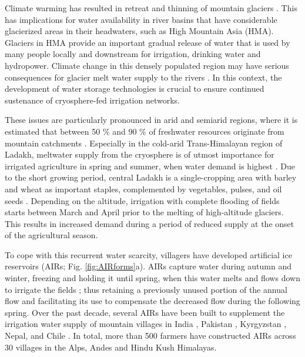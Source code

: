 \documentclass[tc, manuscript]{copernicus}
\begin{document}

\introduction

Climate warming has resulted in retreat and thinning of mountain glaciers
\citep{ipccCrossChapterPaperMountains2022}. This has implications for water availability in river basins that
have considerable glacierized areas in their headwaters, such as High Mountain Asia (HMA). Glaciers in HMA
provide an important gradual release of water that is used by many people locally and downstream for irrigation,
drinking water and hydropower. Climate change in this densely populated region may have serious consequences for
glacier melt water supply to the rivers \citep{immerzeelImportanceVulnerabilityWorld2020}. In this context, the
development of water storage technologies is crucial to ensure continued sustenance of cryosphere-fed irrigation
networks.

These issues are particularly pronounced in arid and semiarid regions, where it is estimated that between 50 \%
and 90 \% of freshwater resources originate from mountain catchments
\citep{mukhopadhyayReevaluationSnowmeltGlacial2015}. Especially in the cold-arid Trans-Himalayan region of
Ladakh, meltwater supply from the cryosphere is of utmost importance for irrigated agriculture in spring and
summer, when water demand is highest \citep{nusserCryosphereFedIrrigationNetworks2019}. Due to the short growing
period, central Ladakh is a single-cropping area with barley and wheat as important staples, complemented by
vegetables, pulses, and oil seeds \citep{nusserSociohydrologyArtificialGlaciers2019}. Depending on the altitude,
irrigation with complete flooding of fields starts between March and April prior to the melting of high-altitude
glaciers. This results in increased demand during a period of reduced supply at the onset of the agricultural
season.

To cope with this recurrent water scarcity, villagers have developed artificial ice reservoirs (AIRs; Fig.
\ref{fig:AIRforms}a). AIRs capture water during autumn and winter, freezing and holding it until spring, when
this water melts and flows down to irrigate the fields \citep{ipccChapterHighMountain2019, vinceGlacierMan2009,
clouseLadakhArtificialGlaciers2017, nusserSociohydrologyArtificialGlaciers2019}; thus retaining a previously
unused portion of the annual flow and facilitating its use to compensate the decreased flow during the following
spring. Over the past decade, several AIRs have been built to supplement the irrigation water supply of mountain
villages in India \citep{wangchukIceStupaCompetition2020, palmerStoringFrozenWater2022,
aggarwalAdaptationClimateChange2021}, Pakistan \citep{awazproductionIceStupaArtificial2022}, Kyrgyzstan
\citep{bbcnewsBrightArtificialGlacier2020}, Nepal, and Chile \citep{reutersConservationistsChileAim2021}. In
total, more than 500 farmers have constructed AIRs across 30 villages in the Alps, Andes and Hindu Kush
Himalayas.
\end{document}
